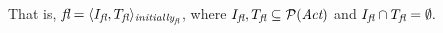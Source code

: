 That is,
$ \emph{fl} = \langle I_{\emph{fl}}, T_{\emph{fl}} \rangle_{\emph{initially}_{\emph{fl}}} $, 
where 
$I_{\emph{fl}},T_{\emph{fl}} \subseteq \mathcal{P}(\emph{Act})$ 
and $I_{\emph{fl}} \cap T_{\emph{fl}} = \emptyset.$\\
